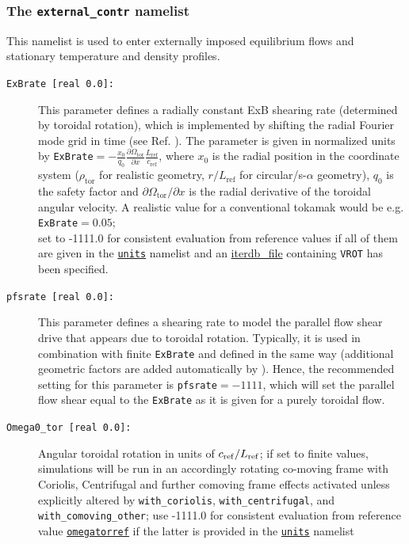 \documentclass[12pt]{article}
\begin{document}
\subsubsection{The \texttt{external\_contr} namelist}
This namelist is used to enter externally imposed equilibrium flows and stationary temperature and density
profiles.
\begin{description}
\item[\texttt{ExBrate [real 0.0]:}] This parameter defines a radially constant ExB shearing rate
  (determined by toroidal rotation), which is implemented by shifting the radial Fourier mode grid in time
  (see Ref. \cite{Hammett06}). The parameter is given in normalized units by 
  \texttt{ExBrate}$=-\frac{x_0}{q_0}\frac{\partial\Omega_{\mathrm{tor}}}{\partial x}\frac{L_\mathrm{ref}}{c_\mathrm{ref}}$,
  where $x_0$ is the radial position in the \gene coordinate system ($\rho_\mathrm{tor}$ for realistic geometry,
  $r/L_\mathrm{ref}$ for 
  circular/s-$\alpha$ geometry), $q_0$ is the safety factor and $\partial\Omega_{\mathrm{tor}}/\partial x$ 
  is the radial derivative of the 
  toroidal angular velocity. A realistic value for a conventional tokamak would be e.g. \texttt{ExBrate}$=0.05$;\\
  set to -1111.0 for consistent evaluation from reference values if all of them are given 
  in the \hyperlink{units_nml}{\tt units} namelist and an \hyperlink{iterdb_file}{iterdb\_file} containing \texttt{VROT} 
  has been specified.
\item[\texttt{pfsrate [real 0.0]:}] This parameter defines a shearing rate to model the parallel flow shear
  drive that appears due to toroidal rotation. Typically, it is used in combination with finite \texttt{ExBrate} and 
  defined in the same way (additional geometric factors are added automatically by \gene). 
  Hence, the recommended setting for this parameter is \texttt{pfsrate}$=-1111$, which will set the parallel flow shear
  equal to the \texttt{ExBrate} as it is given for a purely toroidal flow.
\item[\texttt{Omega0\_tor [real 0.0]:}] Angular toroidal rotation in units of $c_{\rm ref}/L_{\rm ref}$; if set to finite values, simulations will be run in an accordingly rotating co-moving frame with Coriolis, Centrifugal and further comoving frame effects activated unless explicitly altered by {\tt with\_coriolis}, {\tt with\_centrifugal}, and {\tt with\_comoving\_other}; use -1111.0 for consistent evaluation from reference value \hyperlink{omegatorref}{\tt omegatorref} if the latter is provided in the \hyperlink{units_nml}{\tt units} namelist

\end{description}
\end{document}
